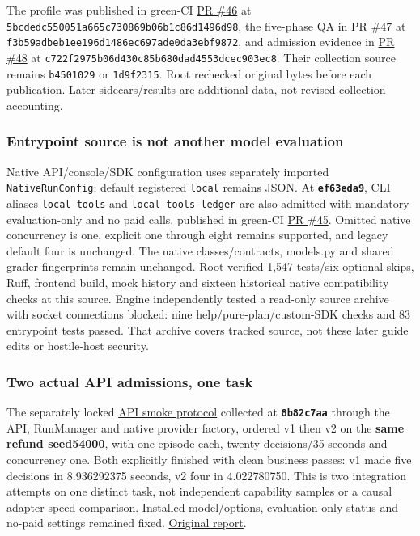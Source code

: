 \documentclass[
  11pt,
  letterpaper,
]{article}
\begin{document}
The profile was published in green-CI
\href{https://github.com/nthpaul/world-engine/pull/46}{PR \#46} at
\texttt{5bcdedc550051a665c730869b06b1c86d1496d98}, the five-phase QA in
\href{https://github.com/nthpaul/world-engine/pull/47}{PR \#47} at
\texttt{f3b59adbeb1ee196d1486ec697ade0da3ebf9872}, and admission
evidence in \href{https://github.com/nthpaul/world-engine/pull/48}{PR
\#48} at \texttt{c722f2975b06d430c85b680dad4553dcec903ec8}. Their
collection source remains \texttt{b4501029} or \texttt{1d9f2315}. Root
rechecked original bytes before each publication. Later sidecars/results
are additional data, not revised collection accounting.

\subsubsection{Entrypoint source is not another model
evaluation}\label{entrypoint-source-is-not-another-model-evaluation}

Native API/console/SDK configuration uses separately imported
\texttt{NativeRunConfig}; default registered \texttt{local} remains
JSON. At \textbf{\texttt{ef63eda9}}, CLI aliases \texttt{local-tools}
and \texttt{local-tools-ledger} are also admitted with mandatory
evaluation-only and no paid calls, published in green-CI
\href{https://github.com/nthpaul/world-engine/pull/45}{PR \#45}. Omitted
native concurrency is one, explicit one through eight remains supported,
and legacy default four is unchanged. The native classes/contracts,
models.py and shared grader fingerprints remain unchanged. Root verified
1,547 tests/six optional skips, Ruff, frontend build, mock history and
sixteen historical native compatibility checks at this source. Engine
independently tested a read-only source archive with socket connections
blocked: nine help/pure-plan/custom-SDK checks and 83 entrypoint tests
passed. That archive covers tracked source, not these later guide edits
or hostile-host security.

\subsubsection{Two actual API admissions, one
task}\label{two-actual-api-admissions-one-task}

The separately locked \href{../native-api-smoke-protocol.md}{API smoke
protocol} collected at \textbf{\texttt{8b82c7aa}} through the API,
RunManager and native provider factory, ordered v1 then v2 on the
\textbf{same refund seed54000}, with one episode each, twenty
decisions/35 seconds and concurrency one. Both explicitly finished with
clean business passes: v1 made five decisions in 8.936292375 seconds, v2
four in 4.022780750. This is two integration attempts on one distinct
task, not independent capability samples or a causal adapter-speed
comparison. Installed model/options, evaluation-only status and no-paid
settings remained fixed.
\href{../../artifacts/native-api-smoke/20261010-v1/report.json}{Original
report}.
\end{document}
